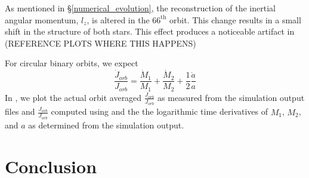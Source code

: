 \documentclass[preprint]{aastex}
\begin{document}
As mentioned in \S \ref{numerical_evolution}, the reconstruction of the inertial angular momentum, $l_z$, is altered in the $66^\mathrm{th}$ orbit. This change results in a small 
shift in the structure of both stars. This effect produces a noticeable artifact in (REFERENCE PLOTS WHERE THIS HAPPENS)

For circular binary orbits, we expect 
\begin{equation}
\label{jdot_eq}
\frac{\dot{J}_{orb}}{J_{orb}} = \frac{\dot{M}_1}{M_1} + \frac{\dot{M}_2}{M_2} + \frac{1}{2} \frac{\dot{a}}{a}
\end{equation}
In , we plot the actual orbit averaged $\frac{\dot{J}_{orb}}{J_{orb}}$ as measured from the simulation output files and  $\frac{\dot{J}_{orb}}{J_{orb}}$ computed using  and the the
logarithmic time derivatives of $M_1$, $M_2$, and $a$ as determined from the simulation output.



\section{Conclusion}
\end{document}
